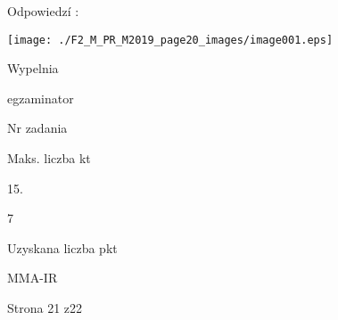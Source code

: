 \documentclass[a4paper,12pt]{article}
\begin{document}
Odpowiedzí :
\begin{center}
\texttt{[image: ./F2\_M\_PR\_M2019\_page20\_images/image001.eps]}
\end{center}
Wypelnia

egzaminator

Nr zadania

Maks. liczba kt

15.

7

Uzyskana liczba pkt

MMA-IR

Strona 21 z22
\end{document}
